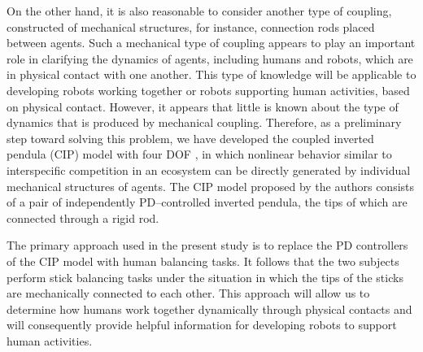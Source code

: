 \documentclass[12pt,a4paper]{ijicic}
\begin{document}
 On the other hand, it is also reasonable to consider another type of
 coupling, constructed of mechanical structures, for instance,
 connection rods placed between agents. Such a mechanical type of
 coupling appears to play an important role in clarifying the dynamics
 of agents, including humans and robots, which are in physical contact
 with one another. This type of knowledge will be applicable to
 developing robots working together or robots supporting human
 activities, based on physical contact.  However, it appears that little
 is known about the type of dynamics that is produced by mechanical
 coupling.
Therefore, as a preliminary step toward solving this problem,
we have developed the coupled inverted pendula (CIP) model with four
DOF \cite{JSDD08}, in which nonlinear behavior similar to interspecific
competition in an ecosystem \cite{hofbauer01} can be directly generated
by individual mechanical structures of agents.  The CIP model proposed
by the authors consists of a pair of independently PD--controlled
inverted pendula, the tips of which are connected through a rigid rod.

 The primary approach used in the present study is to replace the PD controllers of the
 CIP model with human balancing tasks. It follows that the two subjects
 perform stick balancing tasks under the situation in which the tips of the 
 sticks are mechanically connected to each other.
This approach will allow us to determine how humans work together dynamically
 through physical contacts and will consequently provide helpful information 
 for developing robots to support human activities.
\end{document}
